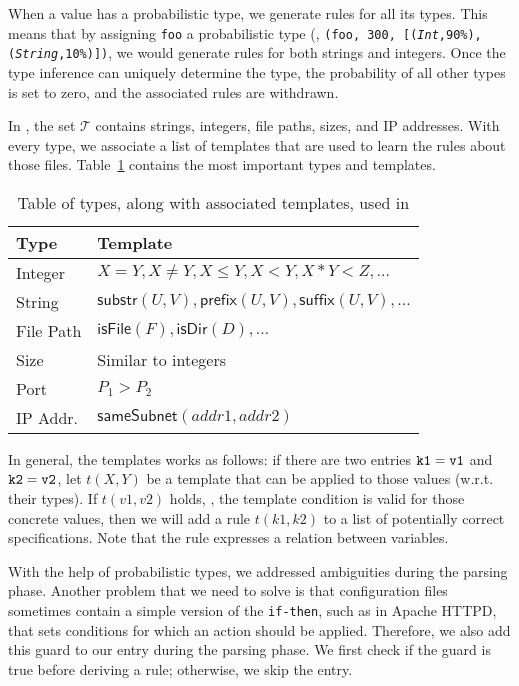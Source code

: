 When a value has a probabilistic type, we generate rules for all its types.
This means that by assigning {\texttt{foo}} a probabilistic type 
(\eg, {\tt (\texttt{foo}, 300, [(\textsl{Int},90\%), 
(\textsl{String},10\%)])},
we would generate rules for both strings and integers.
Once the type inference can uniquely determine the type, 
the probability of all other types is set to zero, 
and the associated rules are withdrawn.

In \app, the set $\mathcal{T}$ contains strings, integers, file paths, 
sizes, and IP addresses. With every type, we associate a list of templates 
that are used to learn the rules about those files. Table~\ref{table:kysymys} contains
the most important types and templates.

\begin{table}
\caption{Table of types, along with associated templates, used in \app}
  \begin{tabular}{| l |  l |}
    \hline
    Type &  Template \\ \hline
    \hline
    Integer & $X = Y, X\neq Y, X \leq Y, X < Y, X * Y < Z, \ldots $\\ \hline
    String & $\textsf{substr}(U, V), \textsf{prefix}(U,V), \textsf{suffix}(U,V), \ldots$   \\ \hline
    File Path & $\textsf{isFile}(F), \textsf{isDir}(D),\ldots$   \\ \hline
    Size & Similar to integers   \\ \hline
    Port & $P_1 > P_2$ \\ \hline
    IP Addr.  & $\textsf{sameSubnet}(addr1, addr2)$   \\
    
    \hline
  \end{tabular}
\label{table:kysymys}
\end{table}


In general, the templates works as follows: if there are two entries ${\tt {k1 = v1}}$ and 
${\tt {k2 = v2}}$, let $t(X, Y)$ be a template that can be applied to those values (w.r.t. their types).
If $t(v1, v2)$ holds, \ie, the template condition is valid for those concrete values, then we will add a rule
$t(k1, k2)$ to a list of potentially correct specifications. Note that the rule expresses a relation between variables.

With the help of probabilistic types, we addressed ambiguities during the parsing phase. Another problem that we need to solve
is that configuration files sometimes contain a simple version of the {\tt {if-then}}, such as in Apache HTTPD, that 
sets conditions for which an action should be applied. Therefore, we also add this guard to our entry 
during the parsing phase. We first check if the guard is true before deriving a rule; otherwise, we skip the entry.

